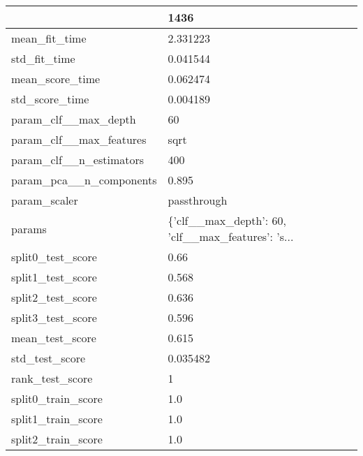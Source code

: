 \begin{tabular}{ll}
\toprule
{} &                                               1436 \\
\midrule
mean\_fit\_time           &                                           2.331223 \\
std\_fit\_time            &                                           0.041544 \\
mean\_score\_time         &                                           0.062474 \\
std\_score\_time          &                                           0.004189 \\
param\_clf\_\_max\_depth    &                                                 60 \\
param\_clf\_\_max\_features &                                               sqrt \\
param\_clf\_\_n\_estimators &                                                400 \\
param\_pca\_\_n\_components &                                              0.895 \\
param\_scaler            &                                        passthrough \\
params                  &  \{'clf\_\_max\_depth': 60, 'clf\_\_max\_features': 's... \\
split0\_test\_score       &                                               0.66 \\
split1\_test\_score       &                                              0.568 \\
split2\_test\_score       &                                              0.636 \\
split3\_test\_score       &                                              0.596 \\
mean\_test\_score         &                                              0.615 \\
std\_test\_score          &                                           0.035482 \\
rank\_test\_score         &                                                  1 \\
split0\_train\_score      &                                                1.0 \\
split1\_train\_score      &                                                1.0 \\
split2\_train\_score      &                                                1.0 \\

\end{tabular}
